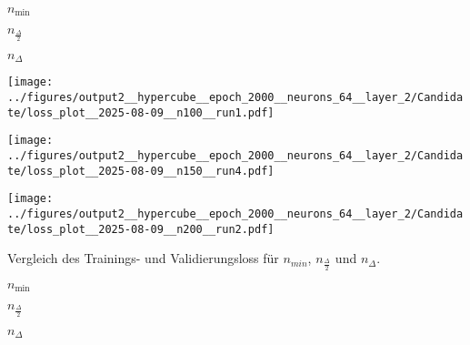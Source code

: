 \begin{otherlanguage}{ngerman}
\begin{samepage}
\begin{minipage}{\textwidth}
\label{fig:matrix_plot_gauss}

\begin{minipage}{0.05\textwidth}\vspace{0.5cm}\end{minipage}%
\begin{minipage}{0.3\textwidth}\centering \textbf{$n_{\mathrm{min}}$}\end{minipage}%
\begin{minipage}{0.3\textwidth}\centering \textbf{$n_{\frac{\Delta}{2}}$}\end{minipage}%
\begin{minipage}{0.3\textwidth}\centering \textbf{$n_{\Delta}$}\end{minipage}

\vspace{0.125cm}

\begin{minipage}{0.05\textwidth}\centering{}\end{minipage}%
\begin{minipage}{0.3\textwidth}
    \centering
    \texttt{[image: ../figures/output2\_\_hypercube\_\_epoch\_2000\_\_neurons\_64\_\_layer\_2/Candidate/loss\_plot\_\_2025-08-09\_\_n100\_\_run1.pdf]}
\end{minipage}%
\begin{minipage}{0.3\textwidth}
    \centering
    \texttt{[image: ../figures/output2\_\_hypercube\_\_epoch\_2000\_\_neurons\_64\_\_layer\_2/Candidate/loss\_plot\_\_2025-08-09\_\_n150\_\_run4.pdf]}
\end{minipage}%
\begin{minipage}{0.3\textwidth}
    \centering
    \texttt{[image: ../figures/output2\_\_hypercube\_\_epoch\_2000\_\_neurons\_64\_\_layer\_2/Candidate/loss\_plot\_\_2025-08-09\_\_n200\_\_run2.pdf]}
\end{minipage}

\caption{Vergleich des Trainings- und Validierungsloss für $n_{min}$, $n_{\frac{\Delta}{2}}$ und $n_{\Delta}$.}
\label{fig:matrix_plot}

\begin{minipage}{0.05\textwidth}\vspace{0.5cm}\end{minipage}%
\begin{minipage}{0.3\textwidth}\centering \textbf{$n_{\mathrm{min}}$}\end{minipage}%
\begin{minipage}{0.3\textwidth}\centering \textbf{$n_{\frac{\Delta}{2}}$}\end{minipage}%
\begin{minipage}{0.3\textwidth}\centering \textbf{$n_{\Delta}$}\end{minipage}


\end{minipage}
\end{samepage}
\end{otherlanguage}
